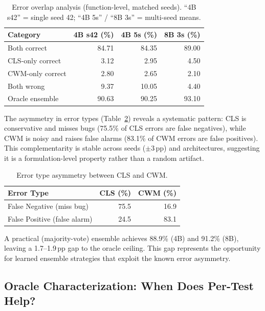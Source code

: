 \documentclass[11pt,a4paper]{article}
\begin{document}
\begin{table}[t]
\centering
\small
\begin{tabular}{lrrr}
\toprule
\textbf{Category} & \textbf{4B s42 (\%)} & \textbf{4B 5s (\%)} & \textbf{8B 3s (\%)} \\
\midrule
Both correct & 84.71 & 84.35 & 89.00 \\
CLS-only correct & 3.12 & 2.95 & 4.50 \\
CWM-only correct & 2.80 & 2.65 & 2.10 \\
Both wrong & 9.37 & 10.05 & 4.40 \\
\midrule
Oracle ensemble & 90.63 & 90.25 & 93.10 \\
\bottomrule
\end{tabular}
\caption{Error overlap analysis (function-level, matched seeds). ``4B s42'' = single seed 42; ``4B 5s'' / ``8B 3s'' = multi-seed means.}
\label{tab:error-overlap}
\end{table}

The asymmetry in error types (Table~\ref{tab:error-type}) reveals a systematic pattern: CLS is conservative and misses bugs (75.5\% of CLS errors are false negatives), while CWM is noisy and raises false alarms (83.1\% of CWM errors are false positives).
This complementarity is stable across seeds ($\pm$3\,pp) and architectures, suggesting it is a formulation-level property rather than a random artifact.

\begin{table}[t]
\centering
\small
\begin{tabular}{lrr}
\toprule
\textbf{Error Type} & \textbf{CLS (\%)} & \textbf{CWM (\%)} \\
\midrule
False Negative (miss bug) & 75.5 & 16.9 \\
False Positive (false alarm) & 24.5 & 83.1 \\
\bottomrule
\end{tabular}
\caption{Error type asymmetry between CLS and CWM.}
\label{tab:error-type}
\end{table}

A practical (majority-vote) ensemble achieves 88.9\% (4B) and 91.2\% (8B), leaving a 1.7--1.9\,pp gap to the oracle ceiling.
This gap represents the opportunity for learned ensemble strategies that exploit the known error asymmetry.

\subsection{Oracle Characterization: When Does Per-Test Help?}
\label{sec:oracle}
\end{document}
